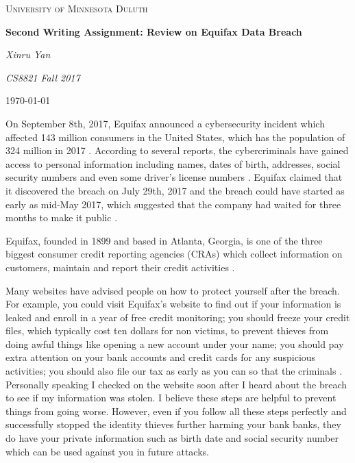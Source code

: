 \documentclass[12pt]{article}
\begin{document}
\begin{titlepage}
	\centering
	{\scshape\LARGE University of Minnesota Duluth \par}
	\vspace{1cm}
	{\scshape\Large \par}
	\vspace{1.5cm}
	{\huge\bfseries Second Writing Assignment: Review on Equifax Data Breach\par}
	\vspace{2cm}
	{\Large\itshape Xinru Yan\par}
	\vspace{2cm}
	{\Large\itshape CS8821 Fall 2017\par}

	\vfill

	{\large \today\par}
\end{titlepage}

\doublespacing

On September 8th, 2017, Equifax announced a cybersecurity incident which affected 143 million consumers in the United States, which has the population of 324 million in 2017 \cite{CI}. According to several reports, the cybercriminals have gained access to personal information including names, dates of birth, addresses, social security numbers and even some driver's license numbers \cite{CI}\cite{WS}. Equifax claimed that it discovered the breach on July 29th, 2017 and the breach could have started as early as mid-May 2017, which suggested that the company had waited for three months to make it public \cite{YG}.

Equifax, founded in 1899 and based in Atlanta, Georgia, is one of the three biggest consumer credit reporting agencies (CRAs) which collect information on customers, maintain and report their credit activities \cite{EQX}. 

Many websites have advised people on how to protect yourself after the breach. For example, you could visit Equifax’s website to find out if your information is leaked and enroll in a year of free credit monitoring; you should freeze your credit files, which typically cost ten dollars for non victims, to prevent thieves from doing awful things like opening a new account under your name; you should pay extra attention on your bank accounts and credit cards for any suspicious activities; you should also file our tax as early as you can so that the criminals \cite{CI} \cite{AM}. Personally speaking I checked on the website soon after I heard about the breach to see if my information was stolen. I believe these steps are helpful to prevent things from going worse. However, even if you follow all these steps perfectly and successfully stopped the identity thieves further harming your bank banks, they do have your private information such as birth date and social security number which can be used against you in future attacks.
\end{document}
